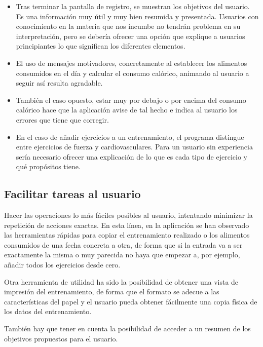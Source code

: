 \documentclass[a4paper]{article}
\begin{document}
		\begin{itemize}
		\item	Tras terminar la pantalla de registro, se muestran los objetivos del usuario. Es una información muy útil y muy bien resumida y presentada. Usuarios con conocimiento en la materia que nos incumbe no tendrán problema en su interpretación, pero se debería ofrecer una opción que explique a usuarios principiantes lo que significan los diferentes elementos.
		
		\item	El uso de mensajes motivadores, concretamente al establecer los alimentos consumidos en el día y calcular el consumo calórico, animando al usuario a seguir así resulta agradable.
		
		\item	También el caso opuesto, estar muy por debajo o por encima del consumo calórico hace que la aplicación avise de tal hecho e indica al usuario los errores que tiene que corregir.
		
		\item	En el caso de añadir ejercicios a un entrenamiento, el programa distingue entre ejercicios de fuerza y cardiovasculares. Para un usuario sin experiencia sería necesario ofrecer una explicación de lo que es cada tipo de ejercicio y qué propósitos tiene.
		\end{itemize}
	
	\subsection{Facilitar tareas al usuario}
	
	Hacer las operaciones lo más fáciles posibles al usuario, intentando minimizar la repetición de acciones exactas. En esta línea, en la aplicación se han observado las herramientas rápidas para copiar el entrenamiento realizado o los alimentos consumidos de una fecha concreta a otra, de forma que si la entrada va a ser exactamente la misma o muy parecida no haya que empezar a, por ejemplo, añadir todos los ejercicios desde cero.
	
	Otra herramienta de utilidad ha sido la posibilidad de obtener una vista de impresión del entrenamiento, de forma que el formato se adecue a las características del papel y el usuario pueda obtener fácilmente una copia física de los datos del entrenamiento.
	
	También hay que tener en cuenta la posibilidad de acceder a un resumen de los objetivos propuestos para el usuario.
	
\end{document}
